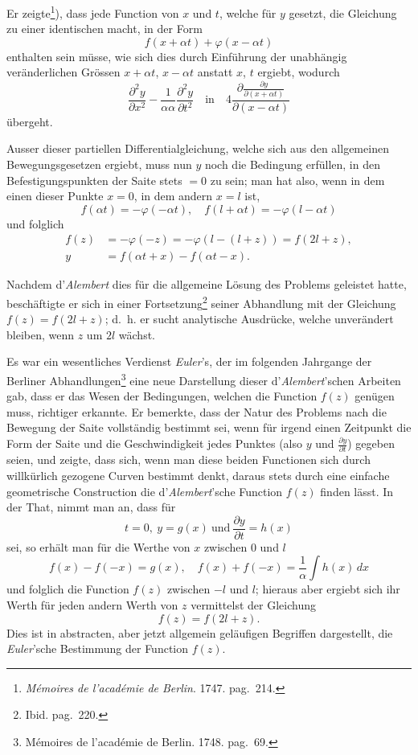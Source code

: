 \documentclass[12pt,a4paper]{book}
\theoremstyle{definition}
\theoremstyle{remark}
\begin{document}
Er zeigte\footnote{\textit{Mémoires de l'académie de Berlin}. 1747. pag.~214.}), dass jede Function von $x$ und $t$, welche für $y$ gesetzt, die Gleichung zu einer identischen macht, in der Form
\[ f(x + \alpha t) + \varphi(x - \alpha t) \]
enthalten sein müsse, wie sich dies durch Einführung der unabhängig veränderlichen Grössen $x + \alpha t$, $x - \alpha t$ anstatt $x$, $t$ ergiebt, wodurch
\[ \frac{\partial^2 y}{\partial x^2} - \frac{1}{\alpha\alpha}\frac{\partial^2 y}{\partial t^2} \quad\text{in}\quad 4\frac{\partial\frac{\partial y}{\partial(x+\alpha t)}}{\partial(x-\alpha t)} \]
übergeht.

Ausser dieser partiellen Differentialgleichung, welche sich aus den allgemeinen Bewegungsgesetzen ergiebt, muss nun $y$ noch die Bedingung erfüllen, in den Befestigungspunkten der Saite stets $= 0$ zu sein; man hat also, wenn in dem einen dieser Punkte $x = 0$, in dem andern $x = l$ ist,
\[ f(\alpha t) = -\varphi(-\alpha t),\quad f(l + \alpha t) = -\varphi(l - \alpha t) \]
und folglich
\begin{align*}
f(z) &= -\varphi(-z) = -\varphi(l - (l+z)) = f(2l + z),\\
y &= f(\alpha t + x) - f(\alpha t - x).
\end{align*}

Nachdem d'\textit{Alembert} dies für die allgemeine Lösung des Problems geleistet hatte, beschäftigte er sich in einer Fortsetzung\footnote{Ibid. pag.~220.} seiner Abhandlung mit der Gleichung $f(z) = f(2l+z)$; d.~h. er sucht analytische Ausdrücke, welche unverändert bleiben, wenn $z$ um $2l$ wächst.

Es war ein wesentliches Verdienst \textit{Euler}'s, der im folgenden Jahrgange der Berliner Abhandlungen\footnote{Mémoires de l'académie de Berlin. 1748. pag.~69.} eine neue Darstellung dieser d'\textit{Alembert}'schen Arbeiten gab, dass er das Wesen der Bedingungen, welchen die Function $f(z)$ genügen muss, richtiger erkannte. Er bemerkte, dass der Natur des Problems nach die Bewegung der Saite vollständig bestimmt sei, wenn für irgend einen Zeitpunkt die Form der Saite und die Geschwindigkeit jedes Punktes (also $y$ und $\frac{\partial y}{\partial t}$) gegeben seien, und zeigte, dass sich, wenn man diese beiden Functionen sich durch willkürlich gezogene Curven bestimmt denkt, daraus stets durch eine einfache geometrische Construction die d'\textit{Alembert}'sche Function $f(z)$ finden lässt. In der That, nimmt man an, dass für
\[ t = 0,\ y = g(x)\ \text{und}\ \frac{\partial y}{\partial t} = h(x) \]
sei, so erhält man für die Werthe von $x$ zwischen $0$ und $l$
\[ f(x) - f(-x) = g(x),\quad f(x) + f(-x) = \frac{1}{\alpha}\int h(x)\,dx \]
und folglich die Function $f(z)$ zwischen $-l$ und $l$; hieraus aber ergiebt sich ihr Werth für jeden andern Werth von $z$ vermittelst der Gleichung
\[ f(z) = f(2l + z). \]
Dies ist in abstracten, aber jetzt allgemein geläufigen Begriffen dargestellt, die \textit{Euler}'sche Bestimmung der Function $f(z)$.
\end{document}
